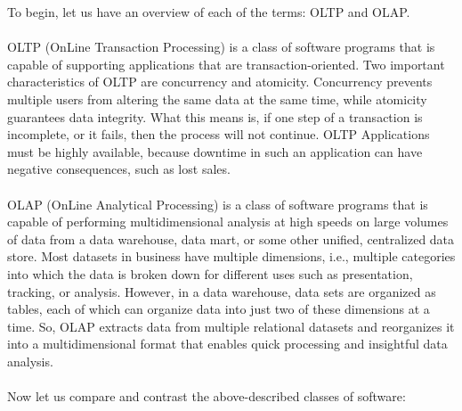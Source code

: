 \documentclass{article}
\begin{document}
To begin, let us have an overview of each of the terms: OLTP and OLAP.
\\ \\
OLTP (OnLine Transaction Processing) is a class of software programs that is capable of supporting applications that are transaction-oriented. Two important characteristics of OLTP are concurrency and atomicity. Concurrency prevents multiple users from altering the same data at the same time, while atomicity guarantees data integrity. What this means is, if one step of a transaction is incomplete, or it fails, then the process will not continue. OLTP Applications must be highly available, because downtime in such an application can have negative consequences, such as lost sales.
\\ \\
OLAP (OnLine Analytical Processing) is a class of software programs that is capable of performing multidimensional analysis at high speeds on large volumes of data from a data warehouse, data mart, or some other unified, centralized data store. Most datasets in business have multiple dimensions, i.e., multiple categories into which the data is broken down for different uses such as presentation, tracking, or analysis. However, in a data warehouse, data sets are organized as tables, each of which can organize data into just two of these dimensions at a time. So, OLAP extracts data from multiple relational datasets and reorganizes it into a multidimensional format that enables quick processing and insightful data analysis.
\\ \\
Now let us compare and contrast the above-described classes of software:
\end{document}
